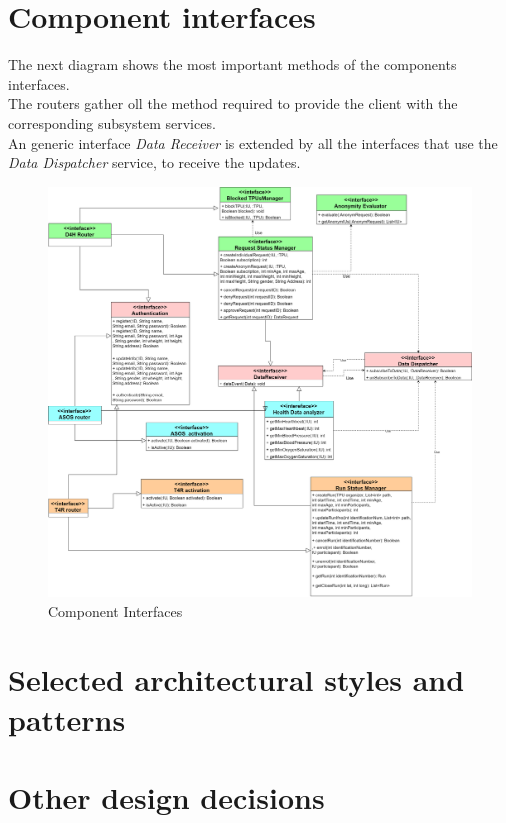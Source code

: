 \section{Component interfaces}
The next diagram shows the most important methods of the components interfaces.\\
The routers gather oll the method required to provide the client with the corresponding subsystem services. \\
An generic interface \textit{Data Receiver} is extended by all the interfaces that use the \textit{Data Dispatcher} service, to receive the updates.
\begin{figure}[H]
\caption{Component Interfaces}
\centering
\includegraphics[width = \textwidth]{sections/architecturalDesign/componentInterfaces.png}
\end{figure}
\section{Selected architectural styles and patterns}
\section{Other design decisions}
